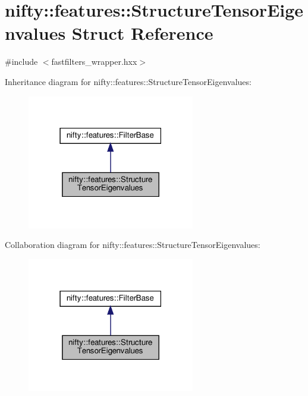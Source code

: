 \hypertarget{structnifty_1_1features_1_1StructureTensorEigenvalues}{}\section{nifty\+:\+:features\+:\+:Structure\+Tensor\+Eigenvalues Struct Reference}
\label{structnifty_1_1features_1_1StructureTensorEigenvalues}


{\ttfamily \#include $<$fastfilters\+\_\+wrapper.\+hxx$>$}



Inheritance diagram for nifty\+:\+:features\+:\+:Structure\+Tensor\+Eigenvalues\+:
\nopagebreak
\begin{figure}[H]
\begin{center}
\leavevmode
\includegraphics[width=207pt]{structnifty_1_1features_1_1StructureTensorEigenvalues__inherit__graph}
\end{center}
\end{figure}


Collaboration diagram for nifty\+:\+:features\+:\+:Structure\+Tensor\+Eigenvalues\+:
\nopagebreak
\begin{figure}[H]
\begin{center}
\leavevmode
\includegraphics[width=207pt]{structnifty_1_1features_1_1StructureTensorEigenvalues__coll__graph}
\end{center}
\end{figure}
